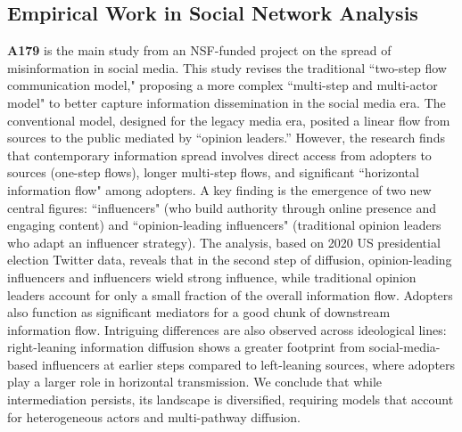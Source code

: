 \documentclass[a4paper,11pt]{extarticle}
\begin{document}
\subsection*{Empirical Work in Social Network Analysis}

\textbf{A179} is the main study from an NSF-funded project on the spread of misinformation in social media. This study revises the traditional ``two-step flow communication model," proposing a more complex ``multi-step and multi-actor model" to better capture information dissemination in the social media era. The conventional model, designed for the legacy media era, posited a linear flow from sources to the public mediated by ``opinion leaders.'' However, the research finds that contemporary information spread involves direct access from adopters to sources (one-step flows), longer multi-step flows, and significant ``horizontal information flow" among adopters. A key finding is the emergence of two new central figures: ``influencers" (who build authority through online presence and engaging content) and ``opinion-leading influencers" (traditional opinion leaders who adapt an influencer strategy). The analysis, based on 2020 US presidential election Twitter data, reveals that in the second step of diffusion, opinion-leading influencers and influencers wield strong influence, while traditional opinion leaders account for only a small fraction of the overall information flow. Adopters also function as significant mediators for a good chunk of downstream information flow. Intriguing differences are also observed across ideological lines: right-leaning information diffusion shows a greater footprint from social-media-based influencers at earlier steps compared to left-leaning sources, where adopters play a larger role in horizontal transmission. We conclude that while intermediation persists, its landscape is diversified, requiring models that account for heterogeneous actors and multi-pathway diffusion.
\end{document}
